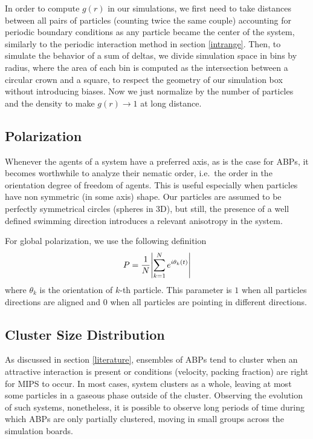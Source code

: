 \documentclass[../../master_thesis_np.tex]{subfiles}
\begin{document}
		In order to compute $g(r)$ in our simulations, we first need to take distances between all pairs of particles (counting twice the same couple) accounting for periodic boundary conditions as any particle became the center of the system, similarly to the periodic interaction method in section \ref{intrange}. Then, to simulate the behavior of a sum of deltas, we divide simulation space in bins by radius, where the area of each bin is computed as the intersection between a circular crown and a square, to respect the geometry of our simulation box without introducing biases. Now we just normalize by the number of particles and the density to make $g(r) \to 1$ at long distance.
		
		\subsection{Polarization}
		Whenever the agents of a system have a preferred axis, as is the case for ABPs, it becomes worthwhile to analyze their nematic order, i.e.\ the order in the orientation degree of freedom of agents. This is useful especially when particles have non symmetric (in some axis) shape. Our particles are assumed to be perfectly symmetrical circles (spheres in 3D), but still, the presence of a well defined swimming direction introduces a relevant anisotropy in the system. 
		
		For global polarization, we use the following definition
		\begin{equation}
			P = \frac{1}{N} \abs{\sum_{k=1}^{N} e^{i \theta_k(t)}} 
		\end{equation}
		where $\theta_k$ is the orientation of $k$-th particle. This parameter is $1$ when all particles directions are aligned and $0$ when all particles are pointing in different directions. 
		
		\subsection{Cluster Size Distribution}
		As discussed in section \ref{literature}, ensembles of ABPs tend to cluster when an attractive interaction is present or conditions (velocity, packing fraction) are right for MIPS to occur. In most cases, system clusters as a whole, leaving at most some particles in a gaseous phase outside of the cluster. Observing the evolution of such systems, nonetheless, it is possible to observe long periods of time during which ABPs are only partially clustered, moving in small groups across the simulation boards. 
		
\end{document}
